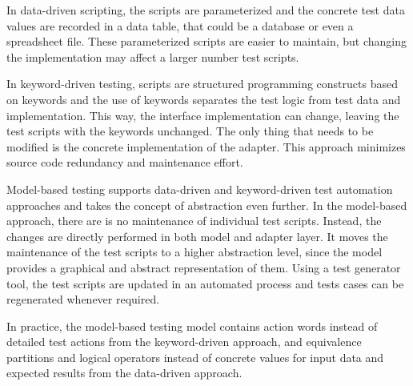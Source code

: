 In data-driven scripting, the scripts are parameterized and the concrete test
data values are recorded in a data table, that could be a database or even a
spreadsheet file. These parameterized scripts are easier to maintain, but
changing the implementation may affect a larger number test scripts.

In keyword-driven testing, scripts are structured programming constructs
based on keywords and the use of keywords separates the test logic from test
data and implementation. This way, the interface implementation can change,
leaving the test scripts with the keywords unchanged. The only thing that needs
to be modified is the concrete implementation of the adapter. This approach
minimizes source code redundancy and maintenance effort.

Model-based testing supports data-driven and keyword-driven test automation
approaches and takes the concept of abstraction even further. In the model-based
approach, there are is no maintenance of individual test scripts. Instead, the
changes are directly performed in both model and adapter layer. It moves the
maintenance of the test scripts to a higher abstraction level, since the model
provides a graphical and abstract representation of them. Using a test generator
tool, the test scripts are updated in an automated process and tests cases can
be regenerated whenever required.

In practice, the model-based testing model contains action words instead of
detailed test actions from the keyword-driven approach, and equivalence
partitions and logical operators instead of concrete values for input data and
expected results from the data-driven approach.